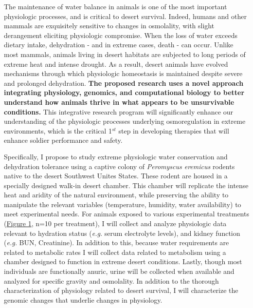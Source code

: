 \documentclass[12pt]{article}
\begin{document}
The maintenance of water balance in animals is one of the most important physiologic processes, and is critical to desert survival. Indeed, humans and other mammals are exquisitely sensitive to changes in osmolality, with slight derangement eliciting physiologic compromise.  When the loss of water exceeds dietary intake, dehydration - and in extreme cases, death - can occur.  Unlike most mammals, animals living in desert habitats are subjected to long periods of extreme heat and intense drought.  As a result, desert animals have evolved mechanisms through which physiologic homeostasis is maintained despite severe and prolonged dehydration. \textbf{The proposed research uses a novel approach integrating physiology, genomics, and computational biology to better understand how animals thrive in what appears to be unsurvivable conditions.} This integrative research program will significantly enhance our understanding of the physiologic processes underlying osmoregulation in extreme environments, which is the critical 1$^{st}$ step in developing therapies that will enhance soldier performance and safety.

Specifically, I propose to study extreme physiologic water conservation and dehydration tolerance using a captive colony of \textit{Peromyscus eremicus} rodents native to the desert Southwest Unites States. These rodent are housed in a specially designed walk-in desert chamber. This chamber will replicate the intense heat and aridity of the natural environment, while preserving the ability to manipulate the relevant variables (temperature, humidity, water availability) to meet experimental needs. For animals exposed to various experimental treatments (\hyperlink{Figure 1}{Figure 1}, n=10 per treatment), I will collect and analyze physiologic data relevant to hydration status (\textit{e.g.} serum electrolyte levels), and kidney function (\textit{e.g.} BUN, Creatinine). In addition to this, because water requirements are related to metabolic rates I will collect data related to metabolism using a chamber designed to function in extreme desert conditions. Lastly, though most individuals are functionally anuric, urine will be collected when available and analyzed for specific gravity and osmolality. In addition to the thorough characterization of physiology related to desert survival, I will characterize the genomic changes that underlie changes in physiology. 
\end{document}

